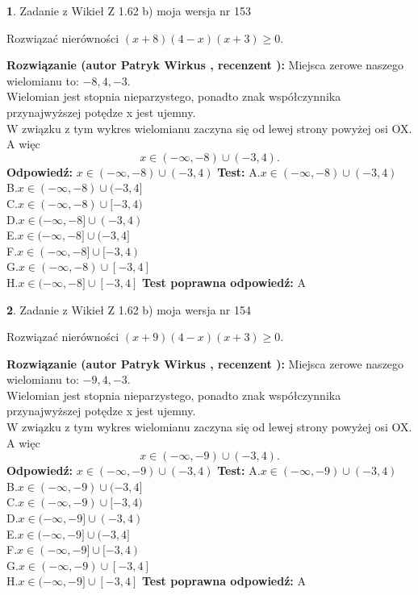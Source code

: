 \documentclass[12pt, a4paper]{article}
\theoremstyle{definition} %
\newtheorem{zad}{}
\newcommand{\zadStart}[1]{\begin{zad}#1\newline}
\newcommand{\zadStop}{\end{zad}}
\newcommand{\rozwStart}[2]{\noindent \textbf{Rozwiązanie (autor #1 , recenzent #2): }\newline}
\newcommand{\rozwStop}{\newline}
\newcommand{\odpStart}{\noindent \textbf{Odpowiedź:}\newline}
\newcommand{\odpStop}{\newline}
\newcommand{\testStart}{\noindent \textbf{Test:}\newline}
\newcommand{\testStop}{\newline}
\newcommand{\kluczStart}{\noindent \textbf{Test poprawna odpowiedź:}\newline}
\newcommand{\kluczStop}{\newline}
\begin{document}
\zadStart{Zadanie z Wikieł Z 1.62 b) moja wersja nr 153}

Rozwiązać nierówności $(x+8)(4-x)(x+3)\ge0$.
\zadStop
\rozwStart{Patryk Wirkus}{}
Miejsca zerowe naszego wielomianu to: $-8, 4, -3$.\\
Wielomian jest stopnia nieparzystego, ponadto znak współczynnika przy\linebreak najwyższej potędze x jest ujemny.\\ W związku z tym wykres wielomianu zaczyna się od lewej strony powyżej osi OX. A więc $$x \in (-\infty,-8) \cup (-3,4).$$
\rozwStop
\odpStart
$x \in (-\infty,-8) \cup (-3,4)$
\odpStop
\testStart
A.$x \in (-\infty,-8) \cup (-3,4)$\\
B.$x \in (-\infty,-8) \cup (-3,4]$\\
C.$x \in (-\infty,-8) \cup [-3,4)$\\
D.$x \in (-\infty,-8] \cup (-3,4)$\\
E.$x \in (-\infty,-8] \cup (-3,4]$\\
F.$x \in (-\infty,-8] \cup [-3,4)$\\
G.$x \in (-\infty,-8) \cup [-3,4]$\\
H.$x \in (-\infty,-8] \cup [-3,4]$
\testStop
\kluczStart
A
\kluczStop



\zadStart{Zadanie z Wikieł Z 1.62 b) moja wersja nr 154}

Rozwiązać nierówności $(x+9)(4-x)(x+3)\ge0$.
\zadStop
\rozwStart{Patryk Wirkus}{}
Miejsca zerowe naszego wielomianu to: $-9, 4, -3$.\\
Wielomian jest stopnia nieparzystego, ponadto znak współczynnika przy\linebreak najwyższej potędze x jest ujemny.\\ W związku z tym wykres wielomianu zaczyna się od lewej strony powyżej osi OX. A więc $$x \in (-\infty,-9) \cup (-3,4).$$
\rozwStop
\odpStart
$x \in (-\infty,-9) \cup (-3,4)$
\odpStop
\testStart
A.$x \in (-\infty,-9) \cup (-3,4)$\\
B.$x \in (-\infty,-9) \cup (-3,4]$\\
C.$x \in (-\infty,-9) \cup [-3,4)$\\
D.$x \in (-\infty,-9] \cup (-3,4)$\\
E.$x \in (-\infty,-9] \cup (-3,4]$\\
F.$x \in (-\infty,-9] \cup [-3,4)$\\
G.$x \in (-\infty,-9) \cup [-3,4]$\\
H.$x \in (-\infty,-9] \cup [-3,4]$
\testStop
\kluczStart
A
\kluczStop
\end{document}
